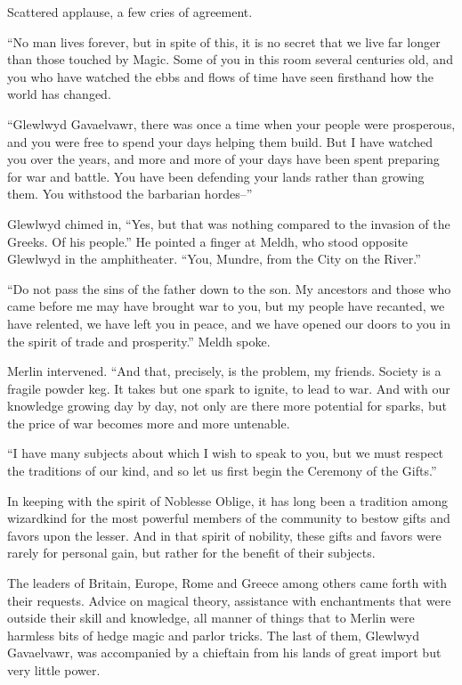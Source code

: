 Scattered applause, a few cries of agreement.

“No man lives forever, but in spite of this, it is no secret that we live far longer than those touched by Magic. Some of you in this room several centuries old, and you who have watched the ebbs and flows of time have seen firsthand how the world has changed.

“Glewlwyd Gavaelvawr, there was once a time when your people were prosperous, and you were free to spend your days helping them build. But I have watched you over the years, and more and more of your days have been spent preparing for war and battle. You have been defending your lands rather than growing them. You withstood the barbarian hordes–”

Glewlwyd chimed in, “Yes, but that was nothing compared to the invasion of the Greeks. Of his people.” He pointed a finger at Meldh, who stood opposite Glewlwyd in the amphitheater. “You, Mundre, from the City on the River.”

“Do not pass the sins of the father down to the son. My ancestors and those who came before me may have brought war to you, but my people have recanted, we have relented, we have left you in peace, and we have opened our doors to you in the spirit of trade and prosperity.” Meldh spoke.

Merlin intervened. “And that, precisely, is the problem, my friends. Society is a fragile powder keg. It takes but one spark to ignite, to lead to war. And with our knowledge growing day by day, not only are there more potential for sparks, but the price of war becomes more and more untenable.

“I have many subjects about which I wish to speak to you, but we must respect the traditions of our kind, and so let us first begin the Ceremony of the Gifts.”

In keeping with the spirit of Noblesse Oblige, it has long been a tradition among wizardkind for the most powerful members of the community to bestow gifts and favors upon the lesser. And in that spirit of nobility, these gifts and favors were rarely for personal gain, but rather for the benefit of their subjects.

The leaders of Britain, Europe, Rome and Greece among others came forth with their requests. Advice on magical theory, assistance with enchantments that were outside their skill and knowledge, all manner of things that to Merlin were harmless bits of hedge magic and parlor tricks. The last of them, Glewlwyd Gavaelvawr, was accompanied by a chieftain from his lands of great import but very little power.

